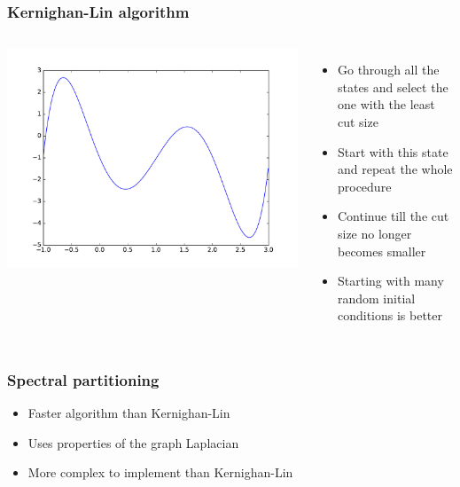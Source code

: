 \documentclass{beamer}
\begin{document}
\begin{frame}
    \frametitle{Kernighan-Lin algorithm}
    \begin{columns}
    \centering
    \includegraphics[width=0.8\columnwidth]{local_minima.pdf}
    \begin{itemize}
        \setlength\itemsep{1em}
        \item{Go through all the states and select the one with the least cut size}
        \item{Start with this state and repeat the whole procedure}
        \item{Continue till the cut size no longer becomes smaller}
        \item{Starting with many random initial conditions is better}
    \end{itemize}
    \end{columns}
\end{frame}
\begin{frame}
    \frametitle{Spectral partitioning}
    \centering

    \begin{itemize}
        \setlength\itemsep{1em}
        \item{Faster algorithm than Kernighan-Lin}
        \item{Uses properties of the graph Laplacian}
        \item{More complex to implement than Kernighan-Lin}
    \end{itemize}
\end{frame}
\end{document}
